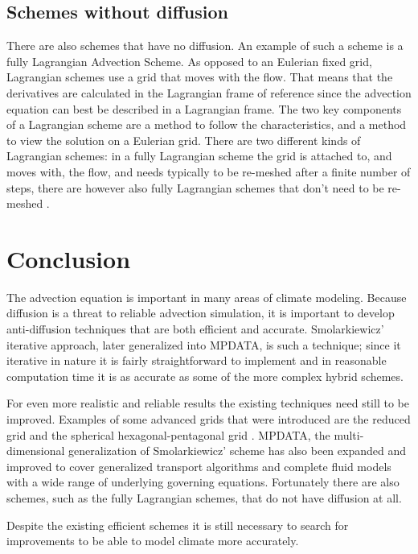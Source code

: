 \documentclass[10pt, a4paper]{article}
\begin{document}
\subsection{Schemes without diffusion}
There are also schemes that have no diffusion. An example of such a scheme is a fully Lagrangian Advection Scheme. As opposed to an Eulerian fixed grid, Lagrangian schemes use a grid that moves with the flow. That means that the derivatives are calculated in the Lagrangian frame of reference since the advection equation can best be described in a Lagrangian frame. The two key components of a Lagrangian scheme are a method to follow the characteristics, and a method to view the solution on a Eulerian grid. There are two different kinds of Lagrangian schemes: in a fully Lagrangian scheme the grid is attached to, and moves with, the flow, and needs typically to be re-meshed after a finite number of steps, there are however also fully Lagrangian schemes that don't need to be re-meshed \cite{nodif}.

\section{Conclusion}
The advection equation is important in many areas of climate modeling. Because diffusion is a threat to reliable advection simulation, it is important to develop anti-diffusion techniques that are both efficient and accurate. Smolarkiewicz' iterative approach, later generalized into MPDATA, is such a technique; since it iterative in nature it is fairly straightforward to implement and in reasonable computation time it is as accurate as some of the more complex hybrid schemes.

For even more realistic and reliable results the existing techniques need still to be improved. Examples of some advanced grids that were introduced are the reduced grid \cite{spee} and the spherical hexagonal-pentagonal grid \cite{lipscomb}. MPDATA, the multi-dimensional generalization of Smolarkiewicz' scheme has also been expanded and improved to cover generalized transport algorithms and complete fluid models with a wide range of underlying governing equations. Fortunately there are also schemes, such as the fully Lagrangian schemes, that do not have diffusion at all.

Despite the existing efficient schemes it is still necessary to search for improvements to be able to model climate more accurately.



\end{document}
